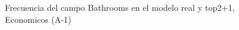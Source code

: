 \begin{figure}[H]
    \centering
    
    \caption{Frecuencia del campo Bathrooms en el modelo real y top2+1, Economicos (A-1)}
    \label{frecuency-Bathrooms-top2+1}
\end{figure}
